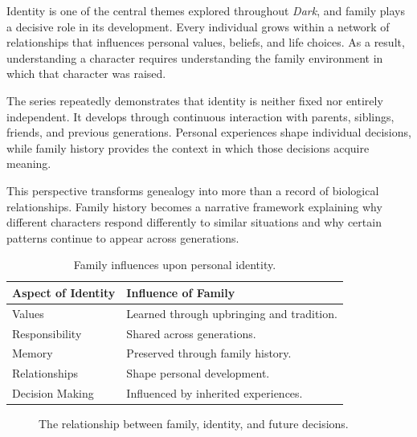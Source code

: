 \documentclass[12pt,oneside,openany]{book}
\begin{document}
Identity is one of the central themes explored throughout \textit{Dark}, and
family plays a decisive role in its development. Every individual grows within
a network of relationships that influences personal values, beliefs, and life
choices. As a result, understanding a character requires understanding the
family environment in which that character was raised.

The series repeatedly demonstrates that identity is neither fixed nor entirely
independent. It develops through continuous interaction with parents,
siblings, friends, and previous generations. Personal experiences shape
individual decisions, while family history provides the context in which those
decisions acquire meaning.

This perspective transforms genealogy into more than a record of biological
relationships. Family history becomes a narrative framework explaining why
different characters respond differently to similar situations and why certain
patterns continue to appear across generations.

\begin{table}[H]
\centering
\begin{tabular}{|p{4cm}|p{8cm}|}
\hline
\textbf{Aspect of Identity} & \textbf{Influence of Family}\\
\hline
Values & Learned through upbringing and tradition.\\
\hline
Responsibility & Shared across generations.\\
\hline
Memory & Preserved through family history.\\
\hline
Relationships & Shape personal development.\\
\hline
Decision Making & Influenced by inherited experiences.\\
\hline
\end{tabular}
\caption{Family influences upon personal identity.}
\end{table}

\begin{figure}[H]
\centering
{}

\caption{The relationship between family, identity, and future decisions.}
\end{figure}
\end{document}

